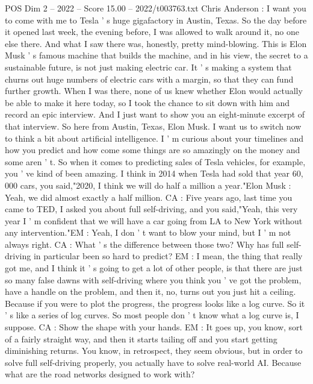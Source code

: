 \begin{textsample}{POS Dim 2 – 2022 – Score 15.00 – 2022/t003763.txt}  \label{ex:f2_pos_033}
Chris Anderson : I want you to come with me to Tesla ' s huge gigafactory in Austin, Texas.
So the day before it opened last week, the evening before, I was allowed to walk around it, no one else there.
And what I saw there was, honestly, pretty mind-blowing.
This is Elon Musk ' s famous machine that builds the machine, and in his view, the secret to a sustainable future, is not just making electric car.
It ' s making a system that churns out huge numbers of electric cars with a margin, so that they can fund further growth.
When I was there, none of us knew whether Elon would actually be able to make it here today, so I took the chance to sit down with him and record an epic interview.
And I just want to show you an eight-minute excerpt of that interview.
So here from Austin, Texas, Elon Musk.
I want us to switch now to think a bit about artificial intelligence.
I ' m curious about your timelines and how you predict and how come some things are so amazingly on the money and some aren ' t.
So when it comes to predicting sales of Tesla vehicles, for example, you ' ve kind of been amazing.
I think in 2014 when Tesla had sold that year 60, 000 cars, you said,"2020, I think we will do half a million a year."Elon Musk : Yeah, we did almost exactly a half million.
CA : Five years ago, last time you came to TED, I asked you about full self-driving, and you said,"Yeah, this very year I ' m confident that we will have a car going from LA to New York without any intervention."EM : Yeah, I don ' t want to blow your mind, but I ' m not always right.
CA : What ' s the difference between those two?
Why has full self-driving in particular been so hard to predict?
EM : I mean, the thing that really got me, and I think it ' s going to get a lot of other people, is that there are just so many false dawns with self-driving where you think you ' ve got the problem, have a handle on the problem, and then it, no, turns out you just hit a ceiling.
Because if you were to plot the progress, the progress looks like a log curve.
So it ' s like a series of log curves.
So most people don ' t know what a log curve is, I suppose.
CA : Show the shape with your hands.
EM : It goes up, you know, sort of a fairly straight way, and then it starts tailing off and you start getting diminishing returns.
You know, in retrospect, they seem obvious, but in order to solve full self-driving properly, you actually have to solve real-world AI.
Because what are the road networks designed to work with?

\end{textsample}
